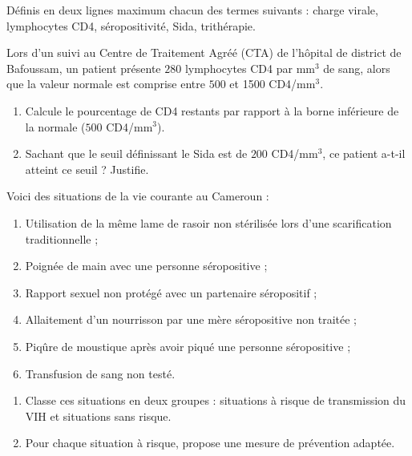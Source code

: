 \documentclass[11pt]{article}
\newcommand{\cle}[1]{{\popxbold\color{popdark}#1}}
\newcounter{popsec}
\newcounter{popsub}
\newcommand{\courssub}[1]{%
  \stepcounter{popsub}%
  \par\vspace{9pt}\noindent{\popxbold\fontsize{11.5}{13}\selectfont\color{popink}{\color{poporange}\thepopsec.\thepopsub}\hspace{6pt}#1}\par\nopagebreak\vspace{4pt}
}
\begin{document}
\begin{exercice}[Définitions]
Définis en deux lignes maximum chacun des termes suivants : \cle{charge virale}, \cle{lymphocytes CD4}, \cle{séropositivité}, \cle{Sida}, \cle{trithérapie}.
\end{exercice}

\begin{exercice}
Lors d'un suivi au Centre de Traitement Agréé (CTA) de l'hôpital de district de Bafoussam, un patient présente $280$ lymphocytes CD4 par mm$^3$ de sang, alors que la valeur normale est comprise entre $500$ et \num{1500} CD4/mm$^3$.
\begin{enumerate}
\item Calcule le pourcentage de CD4 restants par rapport à la borne inférieure de la normale ($500$ CD4/mm$^3$).
\item Sachant que le seuil définissant le Sida est de $200$ CD4/mm$^3$, ce patient a-t-il atteint ce seuil ? Justifie.
\end{enumerate}
\end{exercice}

\courssub{Je m'entraîne}

\begin{exercice}
Voici des situations de la vie courante au Cameroun :
\begin{enumerate}
\item[a.] Utilisation de la même lame de rasoir non stérilisée lors d'une scarification traditionnelle ;
\item[b.] Poignée de main avec une personne séropositive ;
\item[c.] Rapport sexuel non protégé avec un partenaire séropositif ;
\item[d.] Allaitement d'un nourrisson par une mère séropositive non traitée ;
\item[e.] Piqûre de moustique après avoir piqué une personne séropositive ;
\item[f.] Transfusion de sang non testé.
\end{enumerate}
\begin{enumerate}
\item Classe ces situations en deux groupes : situations à risque de transmission du VIH et situations sans risque.
\item Pour chaque situation à risque, propose une mesure de prévention adaptée.
\end{enumerate}
\end{exercice}
\end{document}

